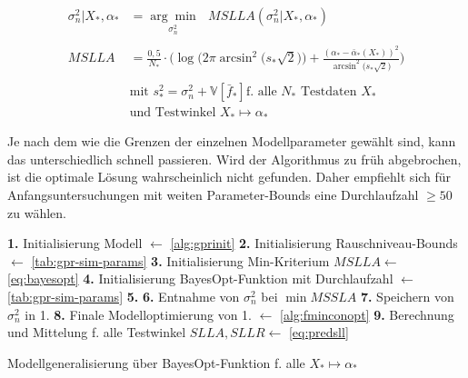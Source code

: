 \begin{align}\label{eq:bayesopt}
\sigma_n^2|X_*,\alpha_* &= \underset{\sigma_n^2}{\arg\min} \text{ } MSLLA(\sigma_n^2|X_*,\alpha_*) \nonumber \\
\\
MSLLA &= \frac{0,5}{N_*} \cdot \bigg( \log \big( 2\pi \arcsin^2 \big( s_* \sqrt{2} \big) \big) + \frac{(\alpha_* - \bar{\alpha}_*(X_*))^2}{\arcsin^2 \big( s_* \sqrt{2} \big)}\bigg) \nonumber
\nonumber \\
\nonumber \\
& \text{mit } s_*^2 = \sigma_n^2 + \mathbb{V}\left[ \bar{f}_* \right] \text{f. alle } N_* \text{ Testdaten } X_* \nonumber \\
& \text{und Testwinkel } X_* \mapsto \alpha_* \nonumber
\end{align}


\clearpage


Je nach dem wie die Grenzen der einzelnen Modellparameter gewählt sind, kann das unterschiedlich schnell passieren. Wird der Algorithmus zu früh abgebrochen, ist die optimale Lösung wahrscheinlich nicht gefunden. Daher empfiehlt sich für Anfangsuntersuchungen mit weiten Parameter-Bounds eine Durchlaufzahl $\ge 50$ zu wählen.


\begin{algorithm}[htp]
	\SetAlgoLined
	\textbf{1.} Initialisierung Modell $\leftarrow$ \autoref{alg:gprinit}\;
	\textbf{2.} Initialisierung Rauschniveau-Bounds $\leftarrow$ \autoref{tab:gpr-sim-params}\;
	\textbf{3.} Initialisierung Min-Kriterium $MSLLA \leftarrow$ \autoref{eq:bayesopt}\;
	\textbf{4.} Initialisierung BayesOpt-Funktion mit Durchlaufzahl $\leftarrow$ \autoref{tab:gpr-sim-params}\;
	\textbf{5.} 
	\textbf{6.} Entnahme von $\sigma_n^2$ bei $\min MSSLA$\;
	\textbf{7.} Speichern von $\sigma_n^2$ in 1.\;
	\textbf{8.} Finale Modelloptimierung von 1. $\leftarrow$ \autoref{alg:fminconopt}\;
	\textbf{9.} Berechnung und Mittelung f. alle Testwinkel $SLLA, SLLR \leftarrow$ \autoref{eq:predsll}\;
	\caption{Modellgeneralisierung über BayesOpt-Funktion f. alle $X_* \mapsto \alpha_*$}
	\label{alg:bayesopt}
\end{algorithm}





